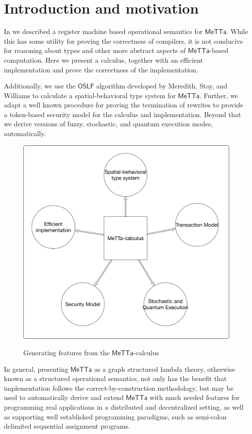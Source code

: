 \section{Introduction and motivation}

In \cite{arxiv:meta-metta-opsem:meredith} we described a register
machine based operational semantics for $\mathsf{MeTTa}$. While this
has some utility for proving the correctness of compilers, it is not
conducive for reasoning about types and other more abstract aspects of
$\mathsf{MeTTa}$-based computation. Here we present a calculus,
together with an efficient implementation and prove the correctness of
the implementation.

Additionally, we use the $\mathsf{OSLF}$ algorithm developed by
Meredith, Stay, and Williams to calculate a spatial-behavioral type
system for $\mathsf{MeTTa}$. Further, we adapt a well known procedure
for proving the termination of rewrites to provide a token-based
security model for the calculus and implementation. Beyond that we
derive versions of fuzzy, stochastic, and quantum execution modes,
automatically.

\begin{figure}
  \centering
  \includegraphics[scale=0.25]{MeTTaCalculusGenerationOfFeatures.pdf} \\
  \caption{Generating features from the $\mathsf{MeTTa}$-calculus}
\end{figure}

In general, presenting $\mathsf{MeTTa}$ as a graph structured lambda
theory, otherwise known as a structured operational semantics, not
only has the benefit that implementation follows the
correct-by-construction methodology, but may be used to automatically
derive and extend $\mathsf{MeTTa}$ with much needed features for
programming real applications in a distributed and decentralized
setting, as well as supporting well established programming paradigms,
such as semi-colon delimited sequential assignment programs.

